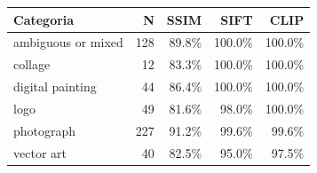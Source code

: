 \begin{tabular}{lrrrr}
\toprule
\textbf{Categoria} & \textbf{N} & \textbf{SSIM} & \textbf{SIFT} & \textbf{CLIP} \\
\midrule
ambiguous or mixed & 128 & 89.8\% & 100.0\% & 100.0\% \\
collage & 12 & 83.3\% & 100.0\% & 100.0\% \\
digital painting & 44 & 86.4\% & 100.0\% & 100.0\% \\
logo & 49 & 81.6\% & 98.0\% & 100.0\% \\
photograph & 227 & 91.2\% & 99.6\% & 99.6\% \\
vector art & 40 & 82.5\% & 95.0\% & 97.5\% \\
\bottomrule
\end{tabular}
